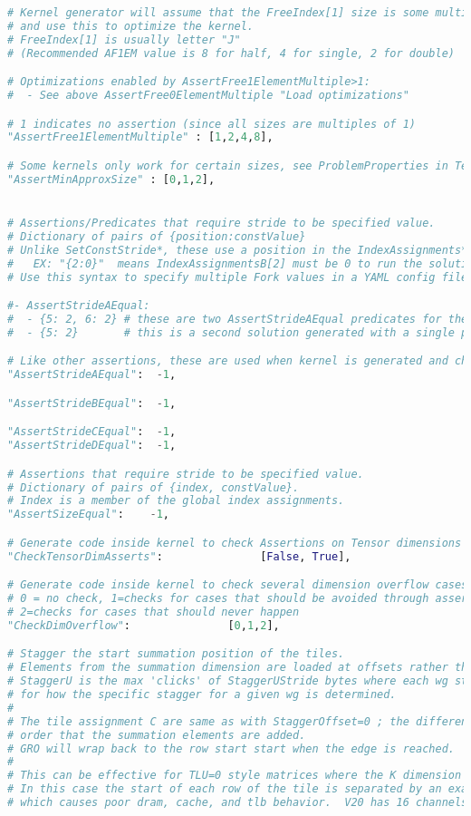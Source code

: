 \documentclass[]{article}
\begin{document}
\begin{lstlisting}[language=python,breaklines=true]
# Kernel generator will assume that the FreeIndex[1] size is some multiple of the element size
# and use this to optimize the kernel.
# FreeIndex[1] is usually letter "J"
# (Recommended AF1EM value is 8 for half, 4 for single, 2 for double)

# Optimizations enabled by AssertFree1ElementMultiple>1:
#  - See above AssertFree0ElementMultiple "Load optimizations"

# 1 indicates no assertion (since all sizes are multiples of 1)
"AssertFree1ElementMultiple" : [1,2,4,8],

# Some kernels only work for certain sizes, see ProblemProperties in TensileTypes for exact defs
"AssertMinApproxSize" : [0,1,2],


# Assertions/Predicates that require stride to be specified value.
# Dictionary of pairs of {position:constValue}
# Unlike SetConstStride*, these use a position in the IndexAssignments* field:
#   EX: "{2:0}"  means IndexAssignmentsB[2] must be 0 to run the solution.
# Use this syntax to specify multiple Fork values in a YAML config file.

#- AssertStrideAEqual:
#  - {5: 2, 6: 2} # these are two AssertStrideAEqual predicates for the same solution.
#  - {5: 2}       # this is a second solution generated with a single predicate.

# Like other assertions, these are used when kernel is generated and checked before running kernel.
"AssertStrideAEqual":  -1,

"AssertStrideBEqual":  -1,

"AssertStrideCEqual":  -1,
"AssertStrideDEqual":  -1,

# Assertions that require stride to be specified value.
# Dictionary of pairs of {index, constValue}.
# Index is a member of the global index assignments.
"AssertSizeEqual":    -1,

# Generate code inside kernel to check Assertions on Tensor dimensions
"CheckTensorDimAsserts":               [False, True],

# Generate code inside kernel to check several dimension overflow cases, in particular around use of 32-bit calcs
# 0 = no check, 1=checks for cases that should be avoided through assertions and kernel selection,
# 2=checks for cases that should never happen
"CheckDimOverflow":               [0,1,2],

# Stagger the start summation position of the tiles.
# Elements from the summation dimension are loaded at offsets rather than all starting at 0.
# StaggerU is the max 'clicks' of StaggerUStride bytes where each wg starts ; see StaggerUMapping
# for how the specific stagger for a given wg is determined.
#
# The tile assignment C are same as with StaggerOffset=0 ; the difference is the
# order that the summation elements are added.
# GRO will wrap back to the row start start when the edge is reached.
#
# This can be effective for TLU=0 style matrices where the K dimension is a large power-of-2.
# In this case the start of each row of the tile is separated by an exact power-of-2
# which causes poor dram, cache, and tlb behavior.  V20 has 16 channels each 256 bytes wide.


\end{lstlisting}
\end{document}
